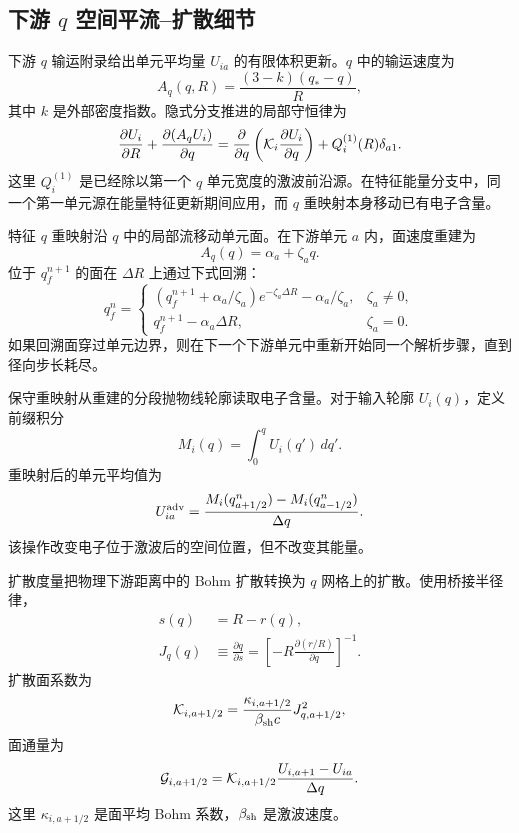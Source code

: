 \documentclass[twocolumn]{aastex702}
\begin{document}
\subsection{下游 \texorpdfstring{\(q\)}{q} 空间平流--扩散细节}

下游 \(q\) 输运附录给出单元平均量 \(U_{ia}\) 的有限体积更新。\(q\) 中的输运速度为
\begin{equation}
A_q(q,R)=\frac{(3-k)(q_\ast-q)}{R},
\end{equation}
其中 \(k\) 是外部密度指数。隐式分支推进的局部守恒律为
\begin{equation}
\frac{\partial U_i}{\partial R}
+\frac{\partial(A_qU_i)}{\partial q}
=\frac{\partial}{\partial q}
\left({\cal K}_i\frac{\partial U_i}{\partial q}\right)
+Q_i^{(1)}(R)\delta_{a1}.
\end{equation}
这里 \(Q_i^{(1)}\) 是已经除以第一个 \(q\) 单元宽度的激波前沿源。在特征能量分支中，同一个第一单元源在能量特征更新期间应用，而 \(q\) 重映射本身移动已有电子含量。

特征 \(q\) 重映射沿 \(q\) 中的局部流移动单元面。在下游单元 \(a\) 内，面速度重建为
\begin{equation}
A_q(q)=\alpha_a+\zeta_a q .
\end{equation}
位于 \(q_f^{n+1}\) 的面在 \(\Delta R\) 上通过下式回溯：
\begin{equation}
q_f^n=
\begin{cases}
\left(q_f^{n+1}+\alpha_a/\zeta_a\right)e^{-\zeta_a\Delta R}
-\alpha_a/\zeta_a, & \zeta_a\ne0,\\
q_f^{n+1}-\alpha_a\Delta R, & \zeta_a=0 .
\end{cases}
\end{equation}
如果回溯面穿过单元边界，则在下一个下游单元中重新开始同一个解析步骤，直到径向步长耗尽。

保守重映射从重建的分段抛物线轮廓读取电子含量。对于输入轮廓 \(U_i(q)\)，定义前缀积分
\begin{equation}
M_i(q)=\int_0^q U_i(q')\,dq' .
\end{equation}
重映射后的单元平均值为
\begin{equation}
U_{ia}^{\rm adv}
=\frac{M_i(q_{a+1/2}^{n})-M_i(q_{a-1/2}^{n})}{\Delta q}.
\end{equation}
该操作改变电子位于激波后的空间位置，但不改变其能量。

扩散度量把物理下游距离中的 Bohm 扩散转换为 \(q\) 网格上的扩散。使用桥接半径律，
\begin{equation}
\begin{aligned}
s(q)&=R-r(q),\\
J_q(q)&\equiv\frac{\partial q}{\partial s}
=\left[-R\frac{\partial(r/R)}{\partial q}\right]^{-1}.
\end{aligned}
\end{equation}
扩散面系数为
\begin{equation}
{\cal K}_{i,a+1/2}
=\frac{\kappa_{i,a+1/2}}{\beta_{\rm sh}c}
J_{q,a+1/2}^{2},
\end{equation}
面通量为
\begin{equation}
{\cal G}_{i,a+1/2}
={\cal K}_{i,a+1/2}
\frac{U_{i,a+1}-U_{ia}}{\Delta q}.
\end{equation}
这里 \(\kappa_{i,a+1/2}\) 是面平均 Bohm 系数，\(\beta_{\rm sh}\) 是激波速度。
\end{document}
